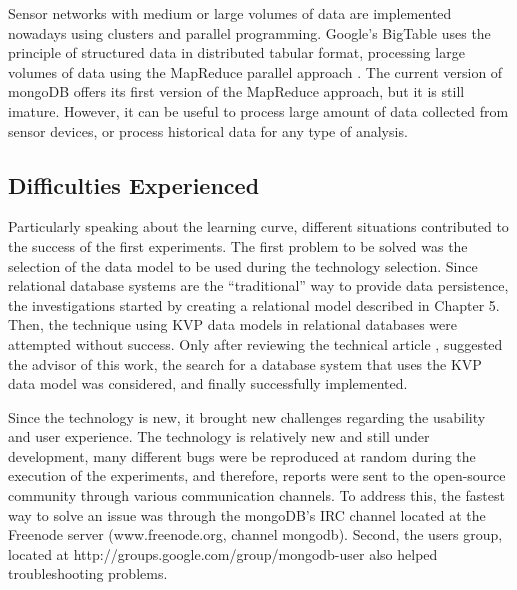 Sensor networks with medium or large volumes of data are implemented nowadays
using clusters and parallel programming. Google's BigTable \cite{bigtable} uses
the principle of structured data in distributed tabular format, processing large
volumes of data using the MapReduce parallel approach \cite{map-reduce}. The
current version of mongoDB offers its first version of the MapReduce approach,
but it is still imature. However, it can be useful to process large amount of
data collected from sensor devices, or process historical data for any type of
analysis.

\subsection{Difficulties Experienced}
\label{sec:experiments-difficulties}

Particularly speaking about the learning curve, different situations
contributed to the success of the first experiments. The first problem to be
solved was the selection of the data model to be used during the technology
selection. Since relational database systems are the ``traditional'' way to
provide data persistence, the investigations started by creating a relational
model described in Chapter 5. Then, the technique using KVP data models in
relational databases were attempted without success. Only after reviewing the
technical article \cite{db-is-rdbs-dommed}, suggested the advisor of this 
work, the search for a database system that uses the KVP data model was
considered, and finally successfully implemented.

Since the technology is new, it brought new challenges regarding the usability
and user experience. The technology is relatively new and still under development,
many different bugs were be reproduced at random during the execution of
the experiments, and therefore, reports were sent to the open-source community
through various communication channels. To address this, the fastest way to
solve an issue was through the mongoDB's IRC channel located at the Freenode
server (www.freenode.org, channel mongodb). Second, the users group, located at
http://groups.google.com/group/mongodb-user also helped troubleshooting
problems.

